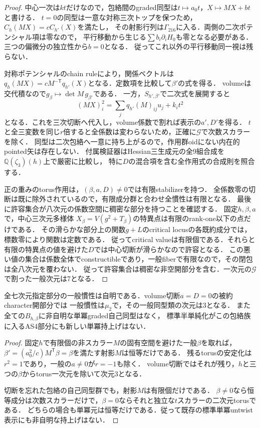 \begin{proof}
中心一次は$kt$だけなので，包絡間のgraded同型は$t\mapsto a_0t$，$X\mapsto MX+b t$と書ける．
$t=0$の同型は一意な対称三次トップを保つため，$C_h(MX)=cC_{h'}(X)$を満たし，
その射影行列は$\Gamma_{216}$に入る．両側の二次ポテンシャル項は零なので，
平行移動から生じる$\sum b_i\partial_iH_0$も零となる必要がある．三つの偏微分の独立性から$b=0$となる．
従ってこれ以外の平行移動同一視は残らない．

対称ポテンシャルのchain ruleにより，関係ベクトルは
$q_h(MX)=cM^{-\mathsf T}q_{h'}(X)$となる．定数項を比較して$\beta'$の式を得る．
volumeは交代積なので$g_\beta\mapsto\det M\,g_{\beta'}$である．
一方，$S_{h',\beta'}$で二次式を展開すると
\[
 (MX)_i^2=\sum_j q_{h'}(M)_{ij}u_j+k_i t^2
\]
となる．これを三次切断へ代入し，volume係数で割れば表示の$a',D'$を得る．
$t$と全三変数を同じ$r$倍すると全係数は変わらないため，正確に$\mathcal G$で次数スカラーを除く．
同型は二次包絡へ一意に持ち上がるので，作用群oidにない内在的pointed矢は存在しない．
付属検証器はHessian三生成元の全9組合成を$\mathbb Q(\zeta_3)(h)$上で厳密に比較し，
特に$D$の混合項を含む全作用式の合成則を照合する．

正の重みのtorus作用は，$(\beta,a,D)\ne0$では有限stabilizerを持つ．
全係数零の切断は既に除外されているので，有限成分群と合わせ全慣性は有限となる．
最後に許容集合が八次元の係数空間に稠密な部分を持つことを確認する．
固定$h,\beta,a$で，中心三次元多様体
$X_\beta=V(g^2+T_\beta)$の特異点は有限のrank-one以下の点だけである．
その滑らかな部分上の関数$g+L$のcritical locusの各既約成分では，標数零により関数は定数である．
従ってcritical valueは有限個である．それらと有限の特異点の値を避けた$D$では中心切断が滑らかなので許容となる．
この悪い値の集合は係数全体でconstructibleであり，一般fiberで有限なので，その閉包は全八次元を覆わない．
従って許容集合は稠密な非空開部分を含む．一次元の$\mathcal G$で割った一般次元は7となる．
\end{proof}

\begin{corollary}[慣性の一般値と単冪持上げ]
\label{cor:beta-inertia-unipotent}
全七次元指定部分の一般慣性は自明である．volume切断$a=D=0$の被約character開部分では
一般慣性は$\mu_2$で，その一般同型類の次元は3となる．
また全ての$B_{h,\beta}$に非自明な単冪graded自己同型はなく，
標準半単純化がこの包絡族に入るAS4部分にも新しい単冪持上げはない．
\end{corollary}
\begin{proof}
固定$h$で有限個の非スカラー$M$の固有空間を避けた一般$\beta$を取れば，
$\beta'=(a_0^2/c)M^{\mathsf T}\beta=\beta$を満たす射影$M$は恒等だけである．
残るtorusの安定化は$r^2=1$であり，一般の$a\ne0$が$r=-1$も除く．
volume切断ではそれが残り，$h$と三つの$\beta$からtorus一次元を除いて次元3となる．

切断を忘れた包絡の自己同型群でも，射影$M$は有限個だけである．
$\beta\ne0$なら恒等成分は次数スカラーだけで，$\beta=0$ならそれと独立な$t$スカラーの二次元torusである．
どちらの場合も単冪元は恒等だけである．従って既存の標準単冪untwist表示にも非自明な持上げはない．
\end{proof}
